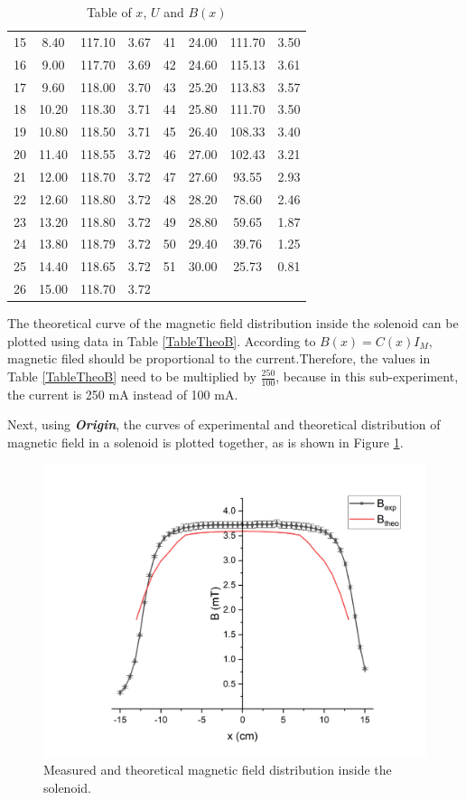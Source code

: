 \documentclass{article}
\begin{document}
\begin{table}[H]
\begin{tabular}{cccc||cccc}
15 & 8.40  & 117.10 & 3.67 & 41 & 24.00 & 111.70 & 3.50 \\
16 & 9.00  & 117.70 & 3.69 & 42 & 24.60 & 115.13 & 3.61 \\
17 & 9.60  & 118.00 & 3.70 & 43 & 25.20 & 113.83 & 3.57 \\
18 & 10.20 & 118.30 & 3.71 & 44 & 25.80 & 111.70 & 3.50 \\
19 & 10.80 & 118.50 & 3.71 & 45 & 26.40 & 108.33 & 3.40 \\
20 & 11.40 & 118.55 & 3.72 & 46 & 27.00 & 102.43 & 3.21 \\
21 & 12.00 & 118.70 & 3.72 & 47 & 27.60 & 93.55  & 2.93 \\
22 & 12.60 & 118.80 & 3.72 & 48 & 28.20 & 78.60  & 2.46 \\
23 & 13.20 & 118.80 & 3.72 & 49 & 28.80 & 59.65  & 1.87 \\
24 & 13.80 & 118.79 & 3.72 & 50 & 29.40 & 39.76  & 1.25 \\
25 & 14.40 & 118.65 & 3.72 & 51 & 30.00 & 25.73  & 0.81 \\
26 & 15.00 & 118.70 & 3.72 &    &       &        &         \\  \bottomrule
\end{tabular}
\caption{Table of $x$, $U$ and $B(x)$}\label{Tab.xUB}
\end{table}


The theoretical curve of the magnetic field distribution inside the solenoid can be plotted using data in Table \ref{TableTheoB}. According to $B(x) = C(x)I_M$, magnetic filed should be proportional to the current.Therefore, the values in Table \ref{TableTheoB} need to be multiplied by $\frac{250}{100}$, because in this sub-experiment, the current is 250 mA instead of 100 mA. 

Next, using \textbf{\textit{Origin}}, the curves of experimental and theoretical distribution of magnetic field in a solenoid is plotted together, as is shown in Figure \ref{FigB}.

\begin{figure}[H]\centering
\includegraphics[scale=0.5]{B-comp.png}
\caption{Measured and theoretical magnetic field distribution inside the solenoid.}\label{FigB}
\end{figure}
\end{document}
